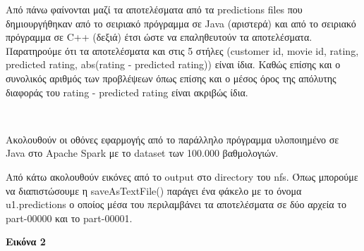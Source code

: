 \documentclass{report}
\begin{document}
\vspace{3mm}

Από πάνω φαίνονται μαζί τα αποτελέσματα από τα \textlatin{predictions files} που δημιουργήθηκαν από το σειριακό πρόγραμμα σε \textlatin{Java} (αριστερά) και από το σειριακό πρόγραμμα σε \textlatin{C++} (δεξιά) έτσι ώστε να επαληθευτούν τα αποτελέσματα. Παρατηρούμε ότι τα αποτελέσματα και στις 5 στήλες (\textlatin{customer id, movie id, rating, predicted rating, abs(rating - predicted rating)}) είναι ίδια. Καθώς επίσης και ο συνολικός αριθμός των προβλέψεων όπως επίσης και ο μέσος όρος της απόλυτης διαφοράς του \textlatin{rating - predicted rating} είναι ακριβώς ίδια.

\vspace{2mm}


\\

\vspace{5mm}

Ακολουθούν οι οθόνες εφαρμογής από το παράλληλο πρόγραμμα υλοποιημένο σε \textlatin{Java} στο \textlatin{Apache Spark} με το \textlatin{dataset} των 100.000 βαθμολογιών.

Από κάτω ακολουθούν εικόνες από το \textlatin{output} στο \textlatin{directory} του \textlatin{nfs}. Όπως μπορούμε να διαπιστώσουμε η \textlatin{saveAsTextFile()} παράγει ένα φάκελο με το όνομα \textlatin{u1.predictions} ο οποίος μέσα του περιλαμβάνει τα αποτελέσματα σε δύο αρχεία το \textlatin{part-00000} και το \textlatin{part-00001}. 

\vspace{2mm}

\textbf{Εικόνα 2}
\end{document}
